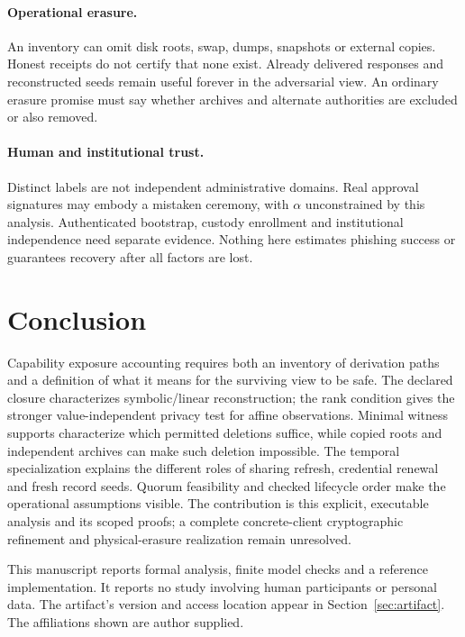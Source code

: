 \documentclass[pdflatex,sn-mathphys-num]{sn-jnl}
\theoremstyle{plain}
\theoremstyle{definition}
\begin{document}
\paragraph{Operational erasure.}
An inventory can omit disk roots, swap, dumps, snapshots or external copies. Honest receipts do not certify that none exist. Already delivered responses and reconstructed seeds remain useful forever in the adversarial view. An ordinary erasure promise must say whether archives and alternate authorities are excluded or also removed.

\paragraph{Human and institutional trust.}
Distinct labels are not independent administrative domains. Real approval signatures may embody a mistaken ceremony, with $\alpha$ unconstrained by this analysis. Authenticated bootstrap, custody enrollment and institutional independence need separate evidence. Nothing here estimates phishing success or guarantees recovery after all factors are lost.

\section{Conclusion}
Capability exposure accounting requires both an inventory of derivation paths and a definition of what it means for the surviving view to be safe. The declared closure characterizes symbolic/linear reconstruction; the rank condition gives the stronger value-independent privacy test for affine observations. Minimal witness supports characterize which permitted deletions suffice, while copied roots and independent archives can make such deletion impossible. The temporal specialization explains the different roles of sharing refresh, credential renewal and fresh record seeds. Quorum feasibility and checked lifecycle order make the operational assumptions visible. The contribution is this explicit, executable analysis and its scoped proofs; a complete concrete-client cryptographic refinement and physical-erasure realization remain unresolved.


\backmatter
{}
This manuscript reports formal analysis, finite model checks and a reference implementation. It reports no study involving human participants or personal data. The artifact's version and access location appear in Section~\ref{sec:artifact}. The affiliations shown are author supplied.
\end{document}
